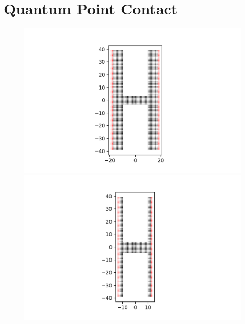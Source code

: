 \documentclass[12pt]{article}
\numberwithin{equation}{section}
\begin{document}
\newpage
\section*{Quantum Point Contact}
\begin{figure}
  \centering
  \begin{minipage}{0.333\textwidth}
      \centering
      \includegraphics[width=1.5\textwidth]{./media/2degconst_W4_L10.png} %
  \end{minipage}\hfill
  \begin{minipage}{0.333\textwidth}
      \centering
      \includegraphics[width=1.6\textwidth]{./media/2degconst_W5_L10.png} %
  \end{minipage}\hfill
  \begin{minipage}{0.333\textwidth}
    \centering

\end{minipage}
\end{figure}
\end{document}
